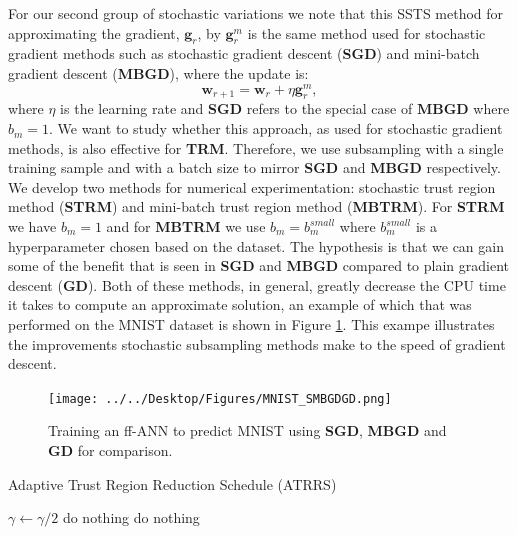 \documentclass[letterpaper,12pt,titlepage,oneside,final]{book}
\begin{document}
	For our second group of stochastic variations we note that this SSTS method for approximating the gradient, $\mathbf{g}_{r}$, by $\mathbf{g}_{r}^{m}$ is the same method used for stochastic gradient methods such as stochastic gradient descent (\textbf{SGD}) and mini-batch gradient descent (\textbf{MBGD}), where the update is:
	\begin{equation}
	\mathbf{w}_{r+1} = \mathbf{w}_{r} + \eta \mathbf{g}_{r}^{m}, 
	\end{equation}
	where $\eta$ is the learning rate and \textbf{SGD} refers to the special case of $\mathbf{MBGD}$ where $b_{m} = 1$. We want to study whether this approach, as used for stochastic gradient methods, is also effective for \textbf{TRM}. Therefore, we use subsampling with a single training sample and with a batch size to mirror \textbf{SGD} and \textbf{MBGD} respectively. We develop two methods for numerical experimentation: stochastic trust region method (\textbf{STRM}) and mini-batch trust region method (\textbf{MBTRM}). For \textbf{STRM} we have $b_{m} = 1$ and for \textbf{MBTRM} we use $b_{m} = b_{m}^{small}$ where $b_{m}^{small}$ is a hyperparameter chosen based on the dataset. The hypothesis is that we can gain some of the benefit that is seen in \textbf{SGD} and \textbf{MBGD} compared to plain gradient descent (\textbf{GD}). Both of these methods, in general, greatly decrease the CPU time it takes to compute an approximate solution, an example of which that was performed on the MNIST dataset \cite{mnist} is shown in Figure \ref{figure:SMBGDGD}. This exampe illustrates the improvements stochastic subsampling methods make to the speed of gradient descent.
	
	\begin{figure}[h]
		\centering
		\texttt{[image: ../../Desktop/Figures/MNIST\_SMBGDGD.png]}
		\caption{Training an ff-ANN to predict MNIST using \textbf{SGD}, \textbf{MBGD} and \textbf{GD} for comparison. }
		\label{figure:SMBGDGD}
	\end{figure}
	
	\begin{algorithm}
		\caption{Adaptive Trust Region Reduction Schedule (ATRRS)}
		\begin{algorithmic}[1]
			\State $\gamma \gets \gamma / 2$
			\Else
			\State do nothing
			\EndIf
			\Else
			\State do nothing
			\EndIf
			\EndFunction
		\end{algorithmic}	
		\label{algorithm:assrs-simple}	
	\end{algorithm}
	
\end{document}

